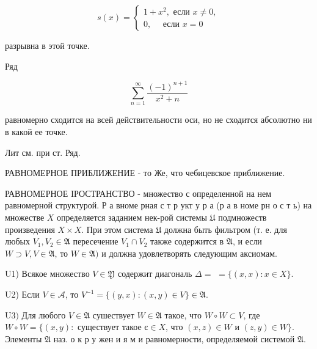 \documentclass[10pt]{article}
\begin{document}
\[

s(x)=\left\{\begin{array}{c}

1+x^{2}, \text { если } x \neq 0, \\

0, \quad \text { если } x=0

\end{array}\right.

\]



разрывна в этой точке.



Ряд



\[

\sum_{n=1}^{\infty} \frac{(-1)^{n+1}}{x^{2}+n}

\]



равномерно сходится на всей действительности оси, но не сходится абсолютно ни в какой ее точке.



Лит см. при ст. Ряд.



РАВНОМЕРНОЕ ПРИБЛИЖЕНИЕ - то Же, что чебицевское приближение.



РАВНОМЕРНОЕ IРОСТРАНСТВО - множество с определенной на нем равномерной структурой. Р а вноме рная с т р укт у р а (р а в номе рн о с т ь) на множестве $X$ определяется заданием нек-рой системы $\mathfrak{U}$ подмножеств произведения $X \times X$. При этом система $\mathfrak{U}$ должна быть фильтром (т. е. для любых $V_{1}, V_{2} \in \mathfrak{A}$ пересечение $V_{1} \cap V_{2}$ также содержится в $\mathfrak{A}$, и если $W \supset V, V \in \mathfrak{A}$, то $W \in \mathfrak{A})$ и должна удовлетворять следующим аксиомам.



U1) Всякое множество $V \in \mathfrak{Y}$ содержит диагональ $\Delta=$ $=\{(x, x): x \in X\}$.



U2) Если $V \in \mathscr{A}$, то $V^{-1}=\{(y, x):(x, y) \in V\} \in \mathfrak{A}$.



$\mathrm{U} 3)$ Для любого $V \in \mathfrak{A}$ сушествует $W \in \mathfrak{A}$ такое, что $W \circ W \subset V$, где $W \circ W=\{(x, y):$ существует такое $є \in X$, что $(x, z) \in W$ и $(z, y) \in W\}$. Элементы $\mathfrak{A}$ наз. о к р у жен и я м и равномерности, определяемой системой $\mathfrak{A}$.
\end{document}
